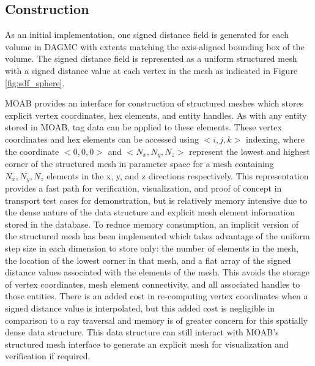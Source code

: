\subsection{Construction}

As an initial implementation, one signed distance field is generated for each
volume in DAGMC with extents matching the axis-aligned bounding box of the
volume. The signed distance field is represented as a uniform structured mesh
with a signed distance value at each vertex in the mesh as indicated in Figure
\ref{fig:sdf_sphere}.

MOAB provides an interface for construction of structured meshes which stores
explicit vertex coordinates, hex elements, and entity handles. As with any
entity stored in MOAB, tag data can be applied to these elements. These vertex
coordinates and hex elements can be accessed using $<i,j,k>$ indexing, where the
coordinate $<0,0,0>$ and $<N_{x}, N_{y}, N_{z}>$ represent the lowest and
highest corner of the structured mesh in parameter space for a mesh containing
$N_{x},N_{y},N_{z}$ elements in the x, y, and z directions respectively. This
representation provides a fast path for verification, visualization, and proof
of concept in transport test cases for demonstration, but is relatively memory
intensive due to the dense nature of the data structure and explicit mesh
element information stored in the database. To reduce  memory consumption,
an implicit version of the structured mesh has been implemented which takes
advantage of the uniform step size in each dimension to store only: the number
of elements in the mesh, the location of the lowest corner in that mesh, and a
flat array of the signed distance values associated with the elements of the
mesh.
This avoids the storage of vertex coordinates, mesh element connectivity, and
all associated handles to those entities. There is an added cost in re-computing
vertex coordinates when a signed distance value is interpolated, but this added
cost is negligible in comparison to a ray traversal and memory is of greater
concern for this spatially dense data structure. This data structure can still
interact with MOAB's structured mesh interface to generate an explicit mesh for
visualization and verification if required.


